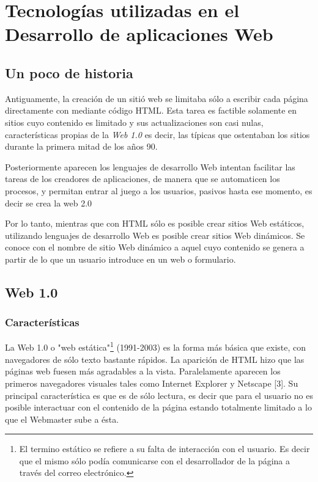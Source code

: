\section{Tecnologías utilizadas en el Desarrollo de aplicaciones Web}
\subsection{Un poco de historia}
Antiguamente, la creación de un sitió web se limitaba sólo  a escribir cada página directamente con mediante
código HTML. Esta tarea es factible solamente en sitios cuyo contenido es limitado y sus actualizaciones son casi nulas,
características propias de la \textit{Web 1.0} es decir, las típicas  que ostentaban los sitios durante 
la primera mitad de los años 90. 

Posteriormente aparecen los lenguajes de desarrollo Web intentan facilitar las tareas de los creadores de aplicaciones, 
de manera que se automaticen los procesos, y permitan entrar al juego a los usuarios, pasivos hasta ese momento, es decir
se crea la web 2.0

Por lo tanto, mientras que con HTML sólo es posible crear sitios Web estáticos, utilizando lenguajes 
de desarrollo Web es posible crear sitios Web dinámicos. Se conoce con el nombre de sitio Web dinámico a aquel
cuyo contenido se genera a partir de lo que un usuario introduce en un web o formulario. 


\subsection{Web 1.0}
\subsubsection{Características}
La Web 1.0 o "web estática"\footnote{El termino estático se refiere a su falta de interacción con el usuario. Es decir que 
el mismo sólo podía comunicarse con el desarrollador de la página a través del correo electrónico.} (1991-2003) es la forma más básica 
que existe, con navegadores de sólo texto bastante rápidos. La aparición de HTML hizo que las páginas web fuesen más agradables 
a la vista. Paralelamente aparecen los primeros navegadores visuales tales como Internet Explorer y Netscape [3]. Su principal
característica es que es de sólo lectura, es decir que para el usuario no es posible interactuar con el contenido de la página 
estando totalmente limitado a lo que el Webmaster sube a ésta.

